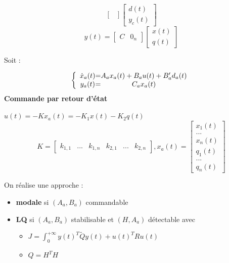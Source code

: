 {{{{\begin{center}
\[\begin{bmatrix}
    \end{bmatrix}
    \begin{bmatrix}
        d(t) \\
        y_{c}(t)
    \end{bmatrix}
    \] \newline
    \[
    y(t) = 
    \begin{bmatrix}
        C & 0_{n}
    \end{bmatrix}
    \begin{bmatrix}
        x(t) \\
        q(t)
    \end{bmatrix}
    \]
\end{center}
Soit : 
\Large{
    \[
\left \{
\begin{array}{c @{=} c}
    \dot x_{a}(t) & A_{a}x_{a}(t) + B_{a}u(t) + B'_{a}d_{a}(t)\\
    y_{a}(t) & C_{a}x_{a}(t)
\end{array}
\right.
\]
\newpage
\large{\textbf{Commande par retour d'état}} 
\begin{center}
    \Large{$
    u(t) = -Kx_{a}(t) =  -K_{1}x(t) - K_{2}q(t)
    $}
    \newline
    \[
    K = 
    \begin{bmatrix}
        k_{1,1} &  ... & k_{1,n} & k_{2,1} & ... & k_{2,n}
    \end{bmatrix}
    , x_{a}(t) = 
    \begin{bmatrix}
        x_{1}(t) \\
        ...      \\
        x_{n}(t) \\
        q_{1}(t) \\
        ...      \\
        q_{n}(t)
    \end{bmatrix}
    \] 
\end{center}
On réalise une approche : 
\begin{itemize}
    \item \textbf{modale} si $(A_{a},B_{a})$ commandable \newline
    \item \textbf{LQ} si $(A_{a},B_{a})$ stabilisable et $(H,A_{a})$ détectable avec \newline 
        \begin{center}
            \begin{itemize}
                \item \Large{$
                    J = \int_{0}^{+\infty}{
                    y(t)^{T}\tilde{Q}y(t) + u(t)^{T}Ru(t)
                    }
                $} \newline
                \item \Large{$
                Q = H^{T}H
                $}
            \end{itemize}
        \end{center}
\end{itemize}

}}}}}
